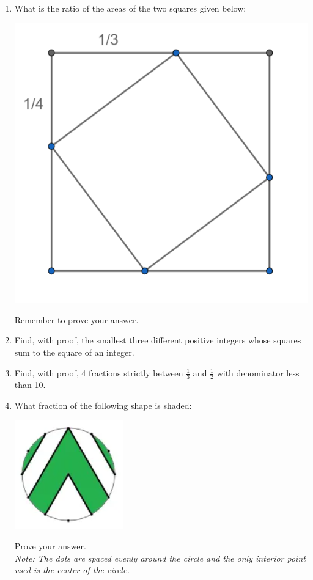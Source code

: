 \begin{enumerate}[1.]


\item What is the ratio of the areas of the two squares given below:
	\begin{center}
	\includegraphics[scale=0.4]{beginner_test_1_img_2.png}	
	\end{center}
Remember to prove your answer.\\


\item Find, with proof, the smallest three different positive integers whose squares sum to the square of an integer. %


\item Find, with proof, 4 fractions strictly between $\frac{1}{3}$ and $\frac{1}{2}$ with denominator less than 10. %


\item What fraction of the following shape is shaded:
	\begin{center}
	\includegraphics[scale=1.0]{beginner_test_1_img_1.png}	
	\end{center}
Prove your answer.\\
\textit{Note: The dots are spaced evenly around the circle and the only interior point used is the center of the circle.}



\end{enumerate}
